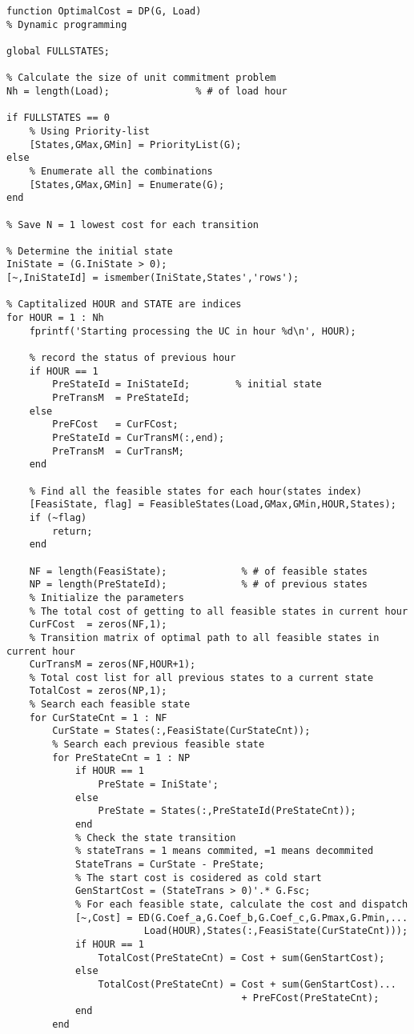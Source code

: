 \begin{verbatim}
function OptimalCost = DP(G, Load)
% Dynamic programming

global FULLSTATES;

% Calculate the size of unit commitment problem
Nh = length(Load);               % # of load hour

if FULLSTATES == 0
    % Using Priority-list
    [States,GMax,GMin] = PriorityList(G);
else
    % Enumerate all the combinations
    [States,GMax,GMin] = Enumerate(G);
end

% Save N = 1 lowest cost for each transition

% Determine the initial state
IniState = (G.IniState > 0);
[~,IniStateId] = ismember(IniState,States','rows');

% Captitalized HOUR and STATE are indices
for HOUR = 1 : Nh
    fprintf('Starting processing the UC in hour %d\n', HOUR);

    % record the status of previous hour
    if HOUR == 1
        PreStateId = IniStateId;        % initial state
        PreTransM  = PreStateId;
    else
        PreFCost   = CurFCost;
        PreStateId = CurTransM(:,end);
        PreTransM  = CurTransM;
    end

    % Find all the feasible states for each hour(states index)
    [FeasiState, flag] = FeasibleStates(Load,GMax,GMin,HOUR,States);
    if (~flag)
        return;
    end

    NF = length(FeasiState);             % # of feasible states
    NP = length(PreStateId);             % # of previous states
    % Initialize the parameters
    % The total cost of getting to all feasible states in current hour
    CurFCost  = zeros(NF,1);
    % Transition matrix of optimal path to all feasible states in current hour
    CurTransM = zeros(NF,HOUR+1);
    % Total cost list for all previous states to a current state
    TotalCost = zeros(NP,1);
    % Search each feasible state
    for CurStateCnt = 1 : NF
        CurState = States(:,FeasiState(CurStateCnt));
        % Search each previous feasible state
        for PreStateCnt = 1 : NP
            if HOUR == 1
                PreState = IniState';
            else
                PreState = States(:,PreStateId(PreStateCnt));
            end
            % Check the state transition
            % stateTrans = 1 means commited, =1 means decommited
            StateTrans = CurState - PreState;
            % The start cost is cosidered as cold start
            GenStartCost = (StateTrans > 0)'.* G.Fsc;
            % For each feasible state, calculate the cost and dispatch
            [~,Cost] = ED(G.Coef_a,G.Coef_b,G.Coef_c,G.Pmax,G.Pmin,...
                        Load(HOUR),States(:,FeasiState(CurStateCnt)));
            if HOUR == 1
                TotalCost(PreStateCnt) = Cost + sum(GenStartCost);
            else
                TotalCost(PreStateCnt) = Cost + sum(GenStartCost)...
                                         + PreFCost(PreStateCnt);
            end
        end


\end{verbatim}
